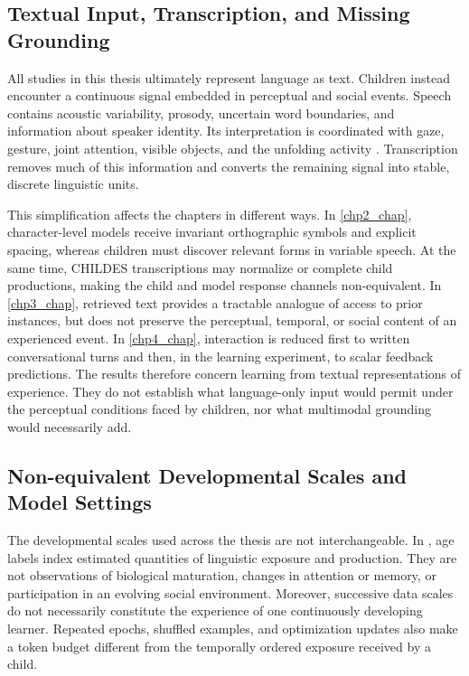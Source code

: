 \subsection{Textual Input, Transcription, and Missing Grounding}

All studies in this thesis ultimately represent language as text. Children instead encounter a continuous signal embedded in perceptual and social events. Speech contains acoustic variability, prosody, uncertain word boundaries, and information about speaker identity. Its interpretation is coordinated with gaze, gesture, joint attention, visible objects, and the unfolding activity \citep{Tomasello1995,Csibra2009}. Transcription removes much of this information and converts the remaining signal into stable, discrete linguistic units.

This simplification affects the chapters in different ways. In \cref{chp2_chap}, character-level models receive invariant orthographic symbols and explicit spacing, whereas children must discover relevant forms in variable speech. At the same time, CHILDES transcriptions may normalize or complete child productions, making the child and model response channels non-equivalent. In \cref{chp3_chap}, retrieved text provides a tractable analogue of access to prior instances, but does not preserve the perceptual, temporal, or social content of an experienced event. In \cref{chp4_chap}, interaction is reduced first to written conversational turns and then, in the learning experiment, to scalar feedback predictions. The results therefore concern learning from textual representations of experience. They do not establish what language-only input would permit under the perceptual conditions faced by children, nor what multimodal grounding would necessarily add.

\subsection{Non-equivalent Developmental Scales and Model Settings}

The developmental scales used across the thesis are not interchangeable. In \meCDI{}, age labels index estimated quantities of linguistic exposure and production. They are not observations of biological maturation, changes in attention or memory, or participation in an evolving social environment. Moreover, successive data scales do not necessarily constitute the experience of one continuously developing learner. Repeated epochs, shuffled examples, and optimization updates also make a token budget different from the temporally ordered exposure received by a child.


